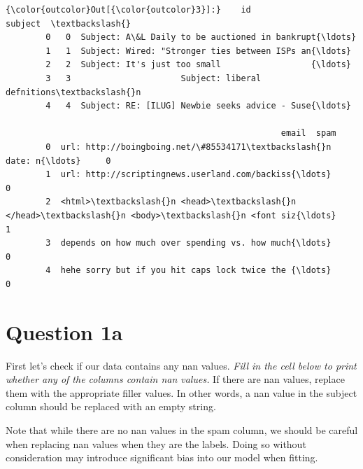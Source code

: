 \documentclass[11pt]{article}
\begin{document}
\begin{Verbatim}[commandchars=\\\{\}]
{\color{outcolor}Out[{\color{outcolor}3}]:}    id                                            subject  \textbackslash{}
        0   0  Subject: A\&L Daily to be auctioned in bankrupt{\ldots}   
        1   1  Subject: Wired: "Stronger ties between ISPs an{\ldots}   
        2   2  Subject: It's just too small                  {\ldots}   
        3   3                      Subject: liberal defnitions\textbackslash{}n   
        4   4  Subject: RE: [ILUG] Newbie seeks advice - Suse{\ldots}   
        
                                                       email  spam  
        0  url: http://boingboing.net/\#85534171\textbackslash{}n date: n{\ldots}     0  
        1  url: http://scriptingnews.userland.com/backiss{\ldots}     0  
        2  <html>\textbackslash{}n <head>\textbackslash{}n </head>\textbackslash{}n <body>\textbackslash{}n <font siz{\ldots}     1  
        3  depends on how much over spending vs. how much{\ldots}     0  
        4  hehe sorry but if you hit caps lock twice the {\ldots}     0  
\end{Verbatim}
            
    \section{Question 1a}\label{question-1a}

First let's check if our data contains any nan values. \emph{Fill in the
cell below to print whether any of the columns contain nan values.} If
there are nan values, replace them with the appropriate filler values.
In other words, a nan value in the subject column should be replaced
with an empty string.

Note that while there are no nan values in the spam column, we should be
careful when replacing nan values when they are the labels. Doing so
without consideration may introduce significant bias into our model when
fitting.
\end{document}
